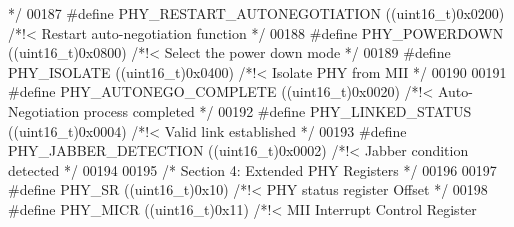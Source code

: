 \begin{DoxyCode}
{       */}
00187 \textcolor{preprocessor}{#}\textcolor{preprocessor}{define} \textcolor{preprocessor}{PHY\_RESTART\_AUTONEGOTIATION}     \textcolor{preprocessor}{(}\textcolor{preprocessor}{(}\textcolor{preprocessor}{uint16\_t}\textcolor{preprocessor}{)}0x0200\textcolor{preprocessor}{)}  \textcolor{comment}{/*!< Restart auto-negotiation function   
       */}
00188 \textcolor{preprocessor}{#}\textcolor{preprocessor}{define} \textcolor{preprocessor}{PHY\_POWERDOWN}                   \textcolor{preprocessor}{(}\textcolor{preprocessor}{(}\textcolor{preprocessor}{uint16\_t}\textcolor{preprocessor}{)}0x0800\textcolor{preprocessor}{)}  \textcolor{comment}{/*!< Select the power down mode          
       */}
00189 \textcolor{preprocessor}{#}\textcolor{preprocessor}{define} \textcolor{preprocessor}{PHY\_ISOLATE}                     \textcolor{preprocessor}{(}\textcolor{preprocessor}{(}\textcolor{preprocessor}{uint16\_t}\textcolor{preprocessor}{)}0x0400\textcolor{preprocessor}{)}  \textcolor{comment}{/*!< Isolate PHY from MII                
       */}
00190 
00191 \textcolor{preprocessor}{#}\textcolor{preprocessor}{define} \textcolor{preprocessor}{PHY\_AUTONEGO\_COMPLETE}           \textcolor{preprocessor}{(}\textcolor{preprocessor}{(}\textcolor{preprocessor}{uint16\_t}\textcolor{preprocessor}{)}0x0020\textcolor{preprocessor}{)}  \textcolor{comment}{/*!< Auto-Negotiation process completed  
       */}
00192 \textcolor{preprocessor}{#}\textcolor{preprocessor}{define} \textcolor{preprocessor}{PHY\_LINKED\_STATUS}               \textcolor{preprocessor}{(}\textcolor{preprocessor}{(}\textcolor{preprocessor}{uint16\_t}\textcolor{preprocessor}{)}0x0004\textcolor{preprocessor}{)}  \textcolor{comment}{/*!< Valid link established              
       */}
00193 \textcolor{preprocessor}{#}\textcolor{preprocessor}{define} \textcolor{preprocessor}{PHY\_JABBER\_DETECTION}            \textcolor{preprocessor}{(}\textcolor{preprocessor}{(}\textcolor{preprocessor}{uint16\_t}\textcolor{preprocessor}{)}0x0002\textcolor{preprocessor}{)}  \textcolor{comment}{/*!< Jabber condition detected           
       */}
00194 
00195 \textcolor{comment}{/* Section 4: Extended PHY Registers */}
00196 
00197 \textcolor{preprocessor}{#}\textcolor{preprocessor}{define} \textcolor{preprocessor}{PHY\_SR}                          \textcolor{preprocessor}{(}\textcolor{preprocessor}{(}\textcolor{preprocessor}{uint16\_t}\textcolor{preprocessor}{)}0x10\textcolor{preprocessor}{)}    \textcolor{comment}{/*!< PHY status register Offset           
                 */}
00198 \textcolor{preprocessor}{#}\textcolor{preprocessor}{define} \textcolor{preprocessor}{PHY\_MICR}                        \textcolor{preprocessor}{(}\textcolor{preprocessor}{(}\textcolor{preprocessor}{uint16\_t}\textcolor{preprocessor}{)}0x11\textcolor{preprocessor}{)}    \textcolor{comment}{/*!< MII Interrupt Control Register       
}
\end{DoxyCode}
